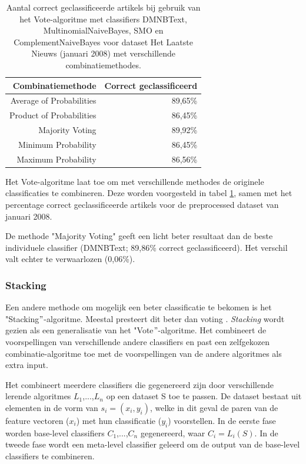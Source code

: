 \begin{table}[htbp]
	\centering
	\caption{Aantal correct geclassificeerde artikels bij gebruik van het Vote-algoritme met classifiers DMNBText, MultinomialNaiveBayes, SMO en ComplementNaiveBayes voor dataset Het Laatste Nieuws (januari 2008) met verschillende combinatiemethodes.}
	\begin{tabular}{rr}
		\toprule
		Combinatiemethode & Correct geclassificeerd \\
		\midrule
		Average of Probabilities & 89,65\% \\
		Product of Probabilities & 86,45\% \\
		Majority Voting & 89,92\% \\
		Minimum Probability & 86,45\% \\
		Maximum Probability & 86,56\% \\
		\bottomrule
	\end{tabular}%
	\label{tab:vote}%
\end{table}%

Het Vote-algoritme laat toe om met verschillende methodes de originele classificaties te combineren. Deze worden voorgesteld in tabel \ref{tab:vote}, samen met het percentage correct geclassificeerde artikels voor de preprocessed dataset van januari 2008.

De methode "Majority Voting" geeft een licht beter resultaat dan de beste individuele classifier (DMNBText; 89,86\% correct geclassificeerd). Het verschil valt echter te verwaarlozen (0,06\%). 

\subsubsection{Stacking}\label{stacking}
Een andere methode om mogelijk een beter classificatie te bekomen is het "Stacking$"$-algoritme. Meestal presteert dit beter dan voting \cite{Sigletos2005}. \textit{Stacking} wordt gezien als een generalisatie van het "Vote$"$-algoritme. Het combineert de voorspellingen van verschillende andere classifiers en past een zelfgekozen combinatie-algoritme toe met de voorspellingen van de andere algoritmes als extra input. 

Het combineert meerdere classifiers die gegenereerd zijn door verschillende lerende algoritmes $L_1$,...,$L_n$ op een dataset S toe te passen. De dataset bestaat uit elementen in de vorm van $s_i = (x_i, y_i)$, welke in dit geval de paren van de feature vectoren ($x_i$) met hun classificatie ($y_i$) voorstellen. In de eerste fase worden base-level classifiers $C_1$,...,$C_n$ gegenereerd, waar $C_i = L_{i}(S)$. In de tweede fase wordt een meta-level classifier geleerd om de output van de base-level classifiers te combineren.


